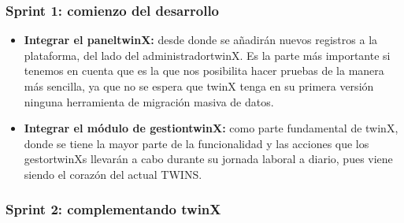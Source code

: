 \subsubsection*{\textbf{Sprint 1: comienzo del desarrollo}}

\begin{itemize}
	\item \textbf{Integrar el \gls{paneltwinX}:} desde donde se añadirán nuevos registros a la plataforma, del lado del \gls{administradortwinX}. Es la parte más importante si tenemos en cuenta que es la que nos posibilita hacer pruebas de la manera más sencilla, ya que no se espera que twinX tenga en su primera versión ninguna herramienta de migración masiva de datos. 

	\item \textbf{Integrar el módulo de \gls{gestiontwinX}:} como parte fundamental de twinX, donde se tiene la mayor parte de la funcionalidad y las acciones que los \glspl{gestortwinX} llevarán a cabo durante su jornada laboral a diario, pues viene siendo el corazón del actual TWINS.
	
\end{itemize}

\subsubsection*{\textbf{Sprint 2: complementando twinX}}

